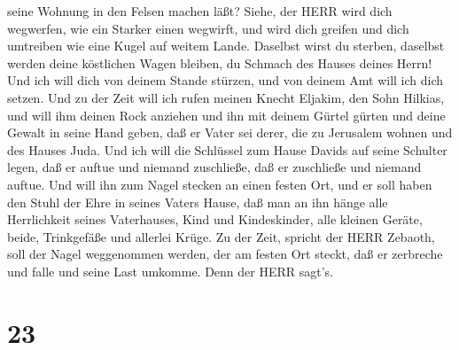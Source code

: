 seine Wohnung in den Felsen machen läßt?  Siehe, der HERR
wird dich wegwerfen, wie ein Starker einen wegwirft, und wird dich
greifen  und dich umtreiben wie eine Kugel auf weitem
Lande. Daselbst wirst du sterben, daselbst werden deine köstlichen Wagen
bleiben, du Schmach des Hauses deines Herrn!  Und ich will
dich von deinem Stande stürzen, und von deinem Amt will ich dich setzen.
 Und zu der Zeit will ich rufen meinen Knecht Eljakim, den
Sohn Hilkias,  und will ihm deinen Rock anziehen und ihn
mit deinem Gürtel gürten und deine Gewalt in seine Hand geben, daß er
Vater sei derer, die zu Jerusalem wohnen und des Hauses Juda.
 Und ich will die Schlüssel zum Hause Davids auf seine
Schulter legen, daß er auftue und niemand zuschließe, daß er zuschließe
und niemand auftue.  Und will ihn zum Nagel stecken an
einen festen Ort, und er soll haben den Stuhl der Ehre in seines Vaters
Hause,  daß man an ihn hänge alle Herrlichkeit seines
Vaterhauses, Kind und Kindeskinder, alle kleinen Geräte, beide,
Trinkgefäße und allerlei Krüge.  Zu der Zeit, spricht der
HERR Zebaoth, soll der Nagel weggenommen werden, der am festen Ort
steckt, daß er zerbreche und falle und seine Last umkomme. Denn der HERR
sagt's.

\hypertarget{section-22}{%
\section{23}\label{section-22}}

